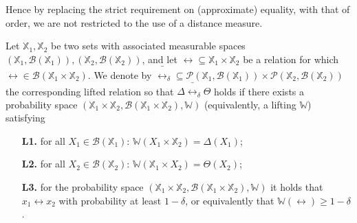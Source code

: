 \documentclass[conference]{IEEEtran}
\newcommand{\X}{{\mathbb{X}}}
\begin{document}
Hence by replacing the strict requirement on (approximate) equality, with that of order,   we are not restricted to the use of a distance measure. %
 


\begin{definition}\label{def:del_lifting}
	Let $\X_1,\X_2$ be two sets with associated measurable spaces $(\X_1,\mathcal B(\X_1)), (\X_2,\mathcal B(\X_2))$,
	and let  $\rel\subseteq \X_1\times \X_2$ be a relation for which $\rel\in \mathcal B(\X_1\times \X_2)$.
	We denote by
	$\bar\rel_\delta\subseteq \mathcal{P}(\X_1,\mathcal B(\X_1))\times \mathcal{P}(\X_2,\mathcal B(\X_2))$ the corresponding lifted relation so that $\Delta \bar \rel_\delta \Theta$ holds if there exists a probability space $(\X_1\times \X_2,\mathcal B(\X_1\times \X_2), \mathbb W)$  (equivalently, a lifting $\mathbb W$) satisfying { \setlength{\parskip}{-1pt}\setlength{\parsep}{0pt}
		\begin{enumerate}
			\item[\textbf{L1.}] for all $X_1\in \mathcal{B}(\X_1)$: $\mathbb W(X_1\times \X_2)=\Delta(X_1)$;
			\item [\textbf{L2.}] for all $X_2\in \mathcal{B}(\X_2)$:  $\mathbb W(\X_1\times X_2)=\Theta(X_2)$;
			\item[\textbf{L3.}] for the probability space  $(\X_1\times \X_2,\mathcal B(\X_1\times \X_2), \mathbb W)$ it holds that
			$x_1\rel x_2$ with probability at least $1-\delta$, or equivalently that $\mathbb{W}\left(\rel\right)\geq1-\delta$.
	\end{enumerate}}%
\end{definition}
\end{document}

